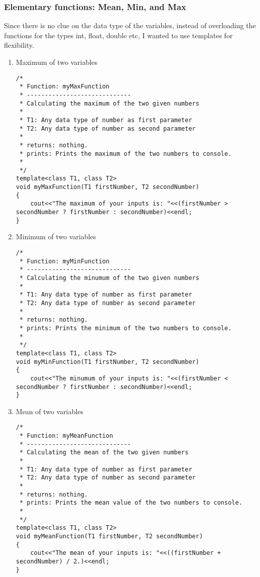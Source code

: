 \documentclass{article}
\begin{document}
		\subsubsection{Elementary functions: Mean, Min, and Max}
		Since there is no clue on the data type of the variables, instead of overloading the functions for the types int, float, double etc, I wanted to use templates for flexibility.
			\begin{enumerate}
  				\item Maximum of two variables \\
  				\begin{lstlisting}[label=max-of-two,caption=Max Of Two!]
/*
 * Function: myMaxFunction
 * -----------------------------
 * Calculating the maximum of the two given numbers
 *
 * T1: Any data type of number as first parameter
 * T2: Any data type of number as second parameter
 *
 * returns: nothing.
 * prints: Prints the maximum of the two numbers to console.
 *
 */
template<class T1, class T2>
void myMaxFunction(T1 firstNumber, T2 secondNumber)
{
	cout<<"The maximum of your inputs is: "<<(firstNumber > secondNumber ? firstNumber : secondNumber)<<endl;
}
\end{lstlisting}  				
  				\item Minimum of two variables \\
  				\begin{lstlisting}[label=min-of-two,caption=Min Of Two!]
/*
 * Function: myMinFunction
 * -----------------------------
 * Calculating the minumum of the two given numbers
 *
 * T1: Any data type of number as first parameter
 * T2: Any data type of number as second parameter
 *
 * returns: nothing.
 * prints: Prints the minimum of the two numbers to console.
 *
 */
template<class T1, class T2>
void myMinFunction(T1 firstNumber, T2 secondNumber)
{
    cout<<"The minumum of your inputs is: "<<(firstNumber < secondNumber ? firstNumber : secondNumber)<<endl;
}
\end{lstlisting}  		
  				\item Mean of two variables \\
  				\begin{lstlisting}[label=mean-of-two,caption=Mean Of Two!]
/*
 * Function: myMeanFunction
 * -----------------------------
 * Calculating the mean of the two given numbers
 *
 * T1: Any data type of number as first parameter
 * T2: Any data type of number as second parameter
 *
 * returns: nothing.
 * prints: Prints the mean value of the two numbers to console.
 *
 */
template<class T1, class T2>
void myMeanFunction(T1 firstNumber, T2 secondNumber)
{
    cout<<"The mean of your inputs is: "<<((firstNumber + secondNumber) / 2.)<<endl;
}
\end{lstlisting}  
			\end{enumerate}
\end{document}
